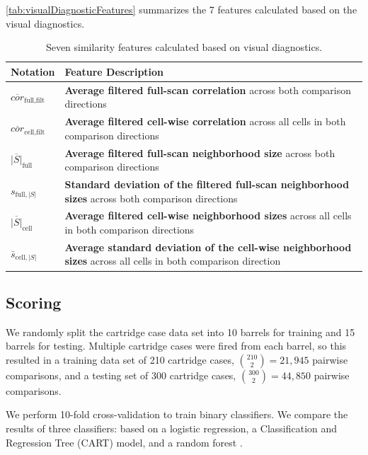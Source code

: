 \documentclass[
]{jdssv}
\begin{document}
\autoref{tab:visualDiagnosticFeatures} summarizes the 7 features
calculated based on the visual diagnostics.

\begin{table}[htbp]
\centering
\begin{tabular}{|p{.11\linewidth}|p{.7\linewidth}|}
\hline
Notation & Feature Description \\
\hline
$\overline{cor}_{\text{full},\text{filt}}$ & \textbf{Average filtered full-scan correlation} across both comparison directions \\
\hline
$\overline{cor}_{\text{cell},\text{filt}}$ & \textbf{Average filtered cell-wise correlation} across all cells in both comparison directions \\
\hline
$\overline{|S|}_{\text{full}}$ & \textbf{Average filtered full-scan neighborhood size} across both comparison directions \\
\hline
$s_{\text{full},|S|}$ & \textbf{Standard deviation of the filtered full-scan neighborhood sizes} across both comparison directions \\
\hline
$\overline{|S|}_{\text{cell}}$ & \textbf{Average filtered cell-wise neighborhood sizes} across all cells in both comparison directions \\
\hline
$\bar{s}_{\text{cell},|S|}$ & \textbf{Average standard deviation of the cell-wise neighborhood sizes} across all cells in both comparison direction \\
\hline
\end{tabular}
\caption{Seven similarity features calculated based on visual diagnostics.}
\label{tab:visualDiagnosticFeatures}
\end{table}

\hypertarget{scoring}{%
\subsection{Scoring}\label{scoring}}

We randomly split the cartridge case data set into 10 barrels for
training and 15 barrels for testing. Multiple cartridge cases were fired
from each barrel, so this resulted in a training data set of 210
cartridge cases, \(\binom{210}{2} = 21,945\) pairwise comparisons, and a
testing set of 300 cartridge cases, \(\binom{300}{2} = 44,850\) pairwise
comparisons.

We perform 10-fold cross-validation to train binary classifiers. We
compare the results of three classifiers: based on a logistic
regression, a Classification and Regression Tree (CART) model, and a
random forest \citep{R,rpart,randomForest,caret}.
\end{document}
